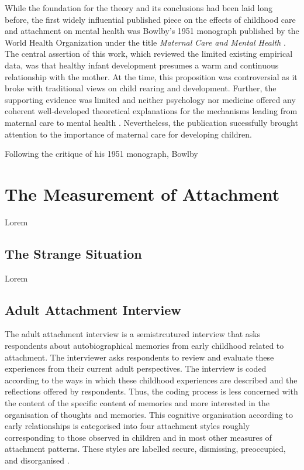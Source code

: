 \documentclass[12pt]{report}
\begin{document}
While the foundation for the theory and its conclusions had been laid long before, the first widely influential published piece on the effects of childhood care and attachment on mental health was Bowlby's 1951 monograph published by the World Health Organization under the title \textit{Maternal Care and Mental Health} \cite{bowlby1951WHO}. The central assertion of this work, which reviewed the limited existing empirical data, was that healthy infant development presumes a warm and continuous relationship with the mother. At the time, this proposition was controversial as it broke with traditional views on child rearing and development. Further, the supporting evidence was limited and neither psychology nor medicine offered any coherent well-developed theoretical explanations for the mechanisms leading from maternal care to mental health \cite{Bowlby1988, who1962deprivation}. Nevertheless, the publication sucessfully brought attention to the importance of maternal care for developing children.

Following the critique of his 1951 monograph, Bowlby 

\section{The Measurement of Attachment}
Lorem

\subsection{The Strange Situation}
Lorem

\subsection{Adult Attachment Interview}
The adult attachment interview is a semistrcutured interview that asks respondents about autobiographical memories from early childhood related to attachment. The interviewer asks respondents to review and evaluate these experiences from their current adult perspectives. The interview is coded according to the ways in which these childhood experiences are described and the reflections offered by respondents. Thus, the coding process is less concerned with the content of the specific content of memories and more interested in the organisation of thoughts and memories. This cognitive organisation according to early relationships is categorised into four attachment styles roughly corresponding to those observed in children and in most other measures of attachment patterns. These styles are labelled secure, dismissing, preoccupied, and disorganised \cite{Hesse1999, AAITest}.
\end{document}

